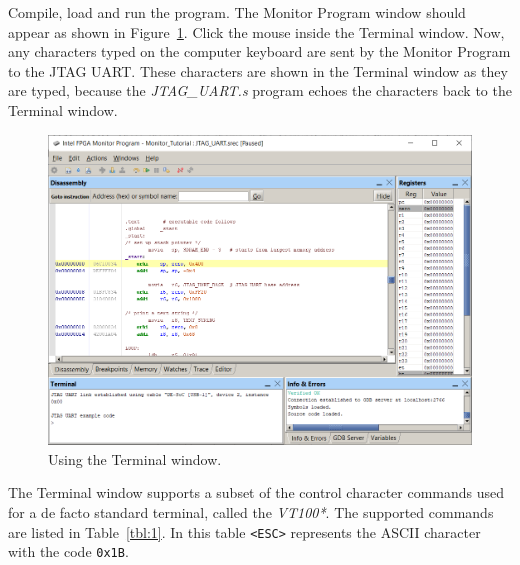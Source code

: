 \documentclass[11pt, twoside, pdftex]{article}
\begin{document}
Compile, load and run the program. The Monitor Program
window should appear as shown in Figure~\ref{fig:23}. 
Click the mouse inside the Terminal window. Now, any characters
typed on the computer keyboard are sent by the Monitor Program to
the JTAG UART. These characters are shown in the Terminal window
as they are typed, because the {\it JTAG\_UART.s} program echoes
the characters back to the Terminal window.

\begin{figure}[H]
   \begin{center}
      \includegraphics[scale=.55]{screenshots/figure23.png}
   \end{center}
   \caption{Using the Terminal window.} 
	 \label{fig:23}
\end{figure}

\newpage
The Terminal window supports a subset of the control character
commands used for a de facto standard terminal, called 
the {\it VT100*}.
The supported commands are listed in Table~\ref{tbl:1}.
In this table \texttt{<ESC>} represents the ASCII character 
with the code \texttt{0x1B}.
\end{document}
